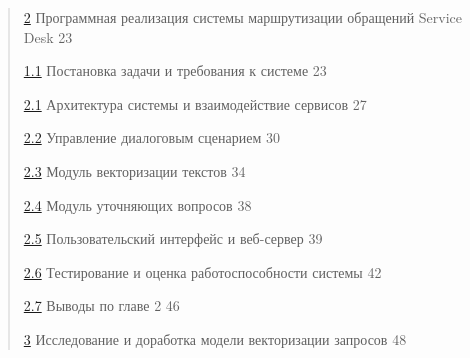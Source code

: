 \begin{quote}
\protect\hyperlink{ux43fux440ux43eux433ux440ux430ux43cux43cux43dux430ux44f-ux440ux435ux430ux43bux438ux437ux430ux446ux438ux44f-ux441ux438ux441ux442ux435ux43cux44b-ux43cux430ux440ux448ux440ux443ux442ux438ux437ux430ux446ux438ux438-ux43eux431ux440ux430ux449ux435ux43dux438ux439-service-desk}{2}
Программная реализация системы маршрутизации обращений Service Desk 23

\protect\hyperlink{ux43fux43eux441ux442ux430ux43dux43eux432ux43aux430-ux437ux430ux434ux430ux447ux438-ux438-ux442ux440ux435ux431ux43eux432ux430ux43dux438ux44f-ux43a-ux441ux438ux441ux442ux435ux43cux435}{1.1}
Постановка задачи и требования к системе 23

\protect\hyperlink{ux430ux440ux445ux438ux442ux435ux43aux442ux443ux440ux430-ux441ux438ux441ux442ux435ux43cux44b-ux438-ux432ux437ux430ux438ux43cux43eux434ux435ux439ux441ux442ux432ux438ux435-ux441ux435ux440ux432ux438ux441ux43eux432}{2.1}
Архитектура системы и взаимодействие сервисов 27

\protect\hyperlink{ux443ux43fux440ux430ux432ux43bux435ux43dux438ux435-ux434ux438ux430ux43bux43eux433ux43eux432ux44bux43c-ux441ux446ux435ux43dux430ux440ux438ux435ux43c}{2.2}
Управление диалоговым сценарием 30

\protect\hyperlink{ux43cux43eux434ux443ux43bux44c-ux432ux435ux43aux442ux43eux440ux438ux437ux430ux446ux438ux438-ux442ux435ux43aux441ux442ux43eux432}{2.3}
Модуль векторизации текстов 34

\protect\hyperlink{ux43cux43eux434ux443ux43bux44c-ux443ux442ux43eux447ux43dux44fux44eux449ux438ux445-ux432ux43eux43fux440ux43eux441ux43eux432}{2.4}
Модуль уточняющих вопросов 38

\protect\hyperlink{ux43fux43eux43bux44cux437ux43eux432ux430ux442ux435ux43bux44cux441ux43aux438ux439-ux438ux43dux442ux435ux440ux444ux435ux439ux441-ux438-ux432ux435ux431-ux441ux435ux440ux432ux435ux440}{2.5}
Пользовательский интерфейс и веб-сервер 39

\protect\hyperlink{ux442ux435ux441ux442ux438ux440ux43eux432ux430ux43dux438ux435-ux438-ux43eux446ux435ux43dux43aux430-ux440ux430ux431ux43eux442ux43eux441ux43fux43eux441ux43eux431ux43dux43eux441ux442ux438-ux441ux438ux441ux442ux435ux43cux44b}{2.6}
Тестирование и оценка работоспособности системы 42

\protect\hyperlink{ux432ux44bux432ux43eux434ux44b-ux43fux43e-ux433ux43bux430ux432ux435-2}{2.7}
Выводы по главе 2 46

\protect\hyperlink{ux438ux441ux441ux43bux435ux434ux43eux432ux430ux43dux438ux435-ux438-ux434ux43eux440ux430ux431ux43eux442ux43aux430-ux43cux43eux434ux435ux43bux438-ux432ux435ux43aux442ux43eux440ux438ux437ux430ux446ux438ux438-ux437ux430ux43fux440ux43eux441ux43eux432}{3}
Исследование и доработка модели векторизации запросов 48


\end{quote}
